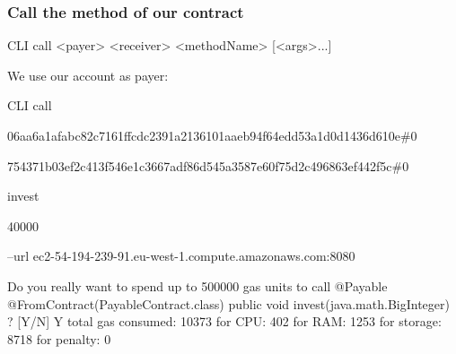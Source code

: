 \documentclass[11pt]{beamer}  %
\def\codesize{\smaller}
\def\<#1>{\codeid{#1}}
\newcommand{\codeid}[1]{\ifmmode{\mbox{\codesize\ttfamily{#1}}}\else{\codesize\ttfamily #1}\fi}
\begin{document}
\begin{frame}[fragile]\frametitle{Call the \<invest> method of our contract}

\begin{tt}
CLI call <payer> <receiver> <methodName> [<args>...]
\end{tt}

\medskip

We use our account as payer:

\medskip

\begin{greenbox}{}
 {\color{armygreen}\scriptsize{\begin{tt}
          CLI call

          06aa6a1afabc82c7161ffcdc2391a2136101aaeb94f64edd53a1d0d1436d610e\#0

          754371b03ef2c413f546e1c3667adf86d545a3587e60f75d2c496863ef442f5c\#0

          invest

          40000

          --url ec2-54-194-239-91.eu-west-1.compute.amazonaws.com:8080
 \end{tt}}}
 {\tiny\begin{semiverbatim}
Do you really want to spend up to 500000 gas units to call
  {\color{red}@Payable @FromContract(PayableContract.class) public void invest(java.math.BigInteger)} ? [Y/N] Y
{\color{armygreen}total gas consumed: 10373}
{\color{darkred}  for CPU: 402
  for RAM: 1253
  for storage: 8718
  for penalty: 0}
    \end{semiverbatim}}
  \end{greenbox}

\end{frame}
\end{document}
